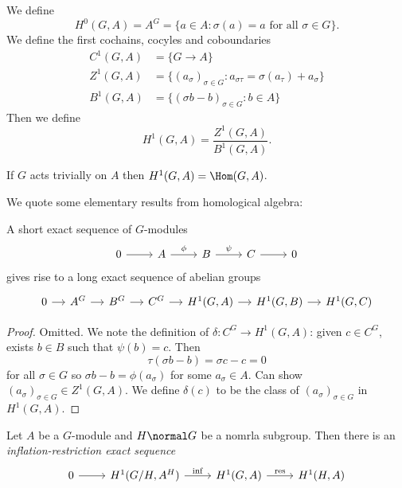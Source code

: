 \documentclass[a4paper]{article}
\theoremstyle{definition}
\begin{document}
\begin{definition}
  We define
  \[
    H^0(G, A) = A^G = \{a \in A: \sigma(a) = a \text{ for all } \sigma \in G\}.
  \]
  We define the first cochains, cocyles and coboundaries 
  \begin{align*}
    C^1(G, A) &= \{G \to A\} \\
    Z^1(G, A) &= \{(a_\sigma)_{\sigma \in G}: a_{\sigma\tau} = \sigma(a_\tau) + a_\sigma\} \\
    B^1(G, A) &= \{(\sigma b - b)_{\sigma \in G}: b \in A\}
  \end{align*}
  Then we define
  \[
    H^1(G, A) = \frac{Z^1(G, A)}{B^1(G, A)}.
  \]
\end{definition}

\begin{remark}
  If \(G\) acts trivially on \(A\) then \(H^1(G, A) = \Hom(G, A)\).
\end{remark}

We quote some elementary results from homological algebra:

\begin{theorem}
  A short exact sequence of \(G\)-modules
  \[
    \begin{tikzcd}
      0 \ar[r] & A \ar[r, "\phi"] & B \ar[r, "\psi"] & C \ar[r] & 0
    \end{tikzcd}
  \]
  gives rise to a long exact sequence of abelian groups
  \[
    \begin{tikzcd}[column sep=small]
      0 \ar[r] & A^G \ar[r] & B^G \ar[r] & C^G \ar[r] & H^1(G, A) \ar[r] & H^1(G, B) \ar[r] & H^1(G, C)
    \end{tikzcd}
  \]
\end{theorem}

\begin{proof}
  Omitted. We note the definition of \(\delta: C^G \to H^1(G, A)\): given \(c \in C^G\), exists \(b \in B\) such that \(\psi(b) = c\). Then
  \[
    \tau(\sigma b - b) = \sigma c - c = 0
  \]
  for all \(\sigma \in G\) so \(\sigma b - b = \phi(a_\sigma)\) for some \(a_\sigma \in A\). Can show \((a_\sigma)_{\sigma \in G} \in Z^1(G, A)\). We define \(\delta(c)\) to be the class of \((a_\sigma)_{\sigma \in G}\) in \(H^1(G, A)\).
\end{proof}

\begin{theorem}
  Let \(A\) be a \(G\)-module and \(H \normal G\) be a nomrla subgroup. Then there is an \emph{inflation-restriction exact sequence}
  \[
    \begin{tikzcd}
      0 \ar[r] & H^1(G/H, A^H) \ar[r, "\mathrm{inf}"] & H^1(G, A) \ar[r, "\mathrm{res}"] & H^1(H, A)
    \end{tikzcd}
  \]
\end{theorem}
\end{document}
